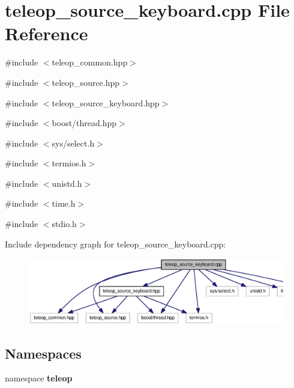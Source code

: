 \section{teleop\_\-source\_\-keyboard.cpp File Reference}
\label{teleop__source__keyboard_8cpp}
{\ttfamily \#include $<$teleop\_\-common.hpp$>$}\par
{\ttfamily \#include $<$teleop\_\-source.hpp$>$}\par
{\ttfamily \#include $<$teleop\_\-source\_\-keyboard.hpp$>$}\par
{\ttfamily \#include $<$boost/thread.hpp$>$}\par
{\ttfamily \#include $<$sys/select.h$>$}\par
{\ttfamily \#include $<$termios.h$>$}\par
{\ttfamily \#include $<$unistd.h$>$}\par
{\ttfamily \#include $<$time.h$>$}\par
{\ttfamily \#include $<$stdio.h$>$}\par
Include dependency graph for teleop\_\-source\_\-keyboard.cpp:
\nopagebreak
\begin{figure}[H]
\begin{center}
\leavevmode
\includegraphics[width=400pt]{teleop__source__keyboard_8cpp__incl}
\end{center}
\end{figure}
\subsection*{Namespaces}
\begin{DoxyCompactItemize}
\item 
namespace {\bf teleop}
\end{DoxyCompactItemize}
